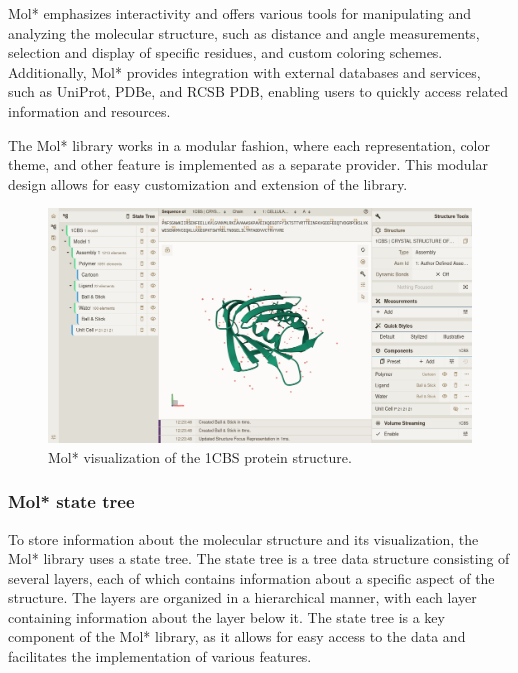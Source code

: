 \documentclass[
  digital,     %
  oneside,     %
  nosansbold,  %
  nocolorbold, %
  lof,         %
  lot,         %
]{fithesis4}
\begin{document}
Mol* emphasizes interactivity and offers various tools for manipulating and analyzing the molecular structure, such as distance and angle measurements, selection and display of specific residues, and custom coloring schemes. Additionally, Mol* provides integration with external databases and services, such as UniProt, PDBe, and RCSB PDB, enabling users to quickly access related information and resources.

The Mol* library works in a modular fashion, where each representation, color theme, and other feature is implemented as a separate provider. This modular design allows for easy customization and extension of the library. \cite{sehnal2021molstar}

\begin{figure}[htbp]
  \begin{center}
    \includegraphics[width=\textwidth]{figures/molstar.png}
  \end{center}
  \caption{Mol* visualization of the 1CBS protein structure.}
  \label{fig:molstar}
\end{figure}

\subsubsection{Mol* state tree}

To store information about the molecular structure and its visualization, the Mol* library uses a state tree. The state tree is a tree data structure consisting of several layers, each of which contains information about a specific aspect of the structure. The layers are organized in a hierarchical manner, with each layer containing information about the layer below it. The state tree is a key component of the Mol* library, as it allows for easy access to the data and facilitates the implementation of various features. \cite{sehnal2021molstar}
\end{document}
